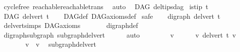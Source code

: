 \begin{isabellebody}
\ cycle{\isacharunderscore}{\kern0pt}free\ reachable{}{\isacharunderscore}{\kern0pt}reachable{\isacharunderscore}{\kern0pt}trans\ \isamarkupfalse%
\ auto%
\endisatagproof
{\isafoldproof}%
%
\isadelimproof
%
\endisadelimproof
%
\isadelimdocument
%
\endisadelimdocument
%
\isatagdocument
%
\isamarkuptrue%
%
\endisatagdocument
{\isafolddocument}%
%
\isadelimdocument
%
\endisadelimdocument
{}\isamarkupfalse%
\ {\isacharparenleft}{\kern0pt}\ DAG{\isacharparenright}{\kern0pt}\ del{\isacharunderscore}{\kern0pt}tips{\isacharunderscore}{\kern0pt}dag{\isacharcolon}{\kern0pt}\isanewline
{}\ {\isachardoublequoteopen}is{\isacharunderscore}{\kern0pt}tip\ t{\isachardoublequoteclose}\isanewline
{}\ {\isachardoublequoteopen}DAG\ {\isacharparenleft}{\kern0pt}del{\isacharunderscore}{\kern0pt}vert\ t{\isacharparenright}{\kern0pt}{\isachardoublequoteclose}\isanewline
%
\isadelimproof
\ \ %
\endisadelimproof
%
\isatagproof
{}\isamarkupfalse%
\ DAG{\isacharunderscore}{\kern0pt}def\ DAG{\isacharunderscore}{\kern0pt}axioms{\isacharunderscore}{\kern0pt}def\isanewline
{}\isamarkupfalse%
\ safe\isanewline
\ \ \isamarkupfalse%
\ {\isachardoublequoteopen}digraph\ {\isacharparenleft}{\kern0pt}del{\isacharunderscore}{\kern0pt}vert\ t{\isacharparenright}{\kern0pt}{\isachardoublequoteclose}\ \isamarkupfalse%
\ del{\isacharunderscore}{\kern0pt}vert{\isacharunderscore}{\kern0pt}simps\ DAG{\isacharunderscore}{\kern0pt}axioms\ \isanewline
\ \ \ \ \ \ digraph{\isacharunderscore}{\kern0pt}def\isanewline
\ \ \ \ \isamarkupfalse%
\ digraph{\isacharunderscore}{\kern0pt}subgraph\ subgraph{\isacharunderscore}{\kern0pt}del{\isacharunderscore}{\kern0pt}vert\isanewline
\ \ \ \ \isamarkupfalse%
\ auto\ \isanewline
{}\isamarkupfalse%
\ \isanewline
\ \ \ \ \isamarkupfalse%
\ v\isanewline
\ \ \ \ \isamarkupfalse%
\ {\isachardoublequoteopen}v\ {\isasymrightarrow}\isactrlsup {\isacharplus}{\kern0pt}\isactrlbsub del{\isacharunderscore}{\kern0pt}vert\ t\isactrlesub \ v{\isachardoublequoteclose}\isanewline
\ \ \ \ \isamarkupfalse%
\ \isamarkupfalse%
\ {\isachardoublequoteopen}v\ {\isasymrightarrow}\isactrlsup {\isacharplus}{\kern0pt}\ v{\isachardoublequoteclose}\ \isamarkupfalse%
\ subgraph{\isacharunderscore}{\kern0pt}del{\isacharunderscore}{\kern0pt}vert\isanewline
\ \ \ \ \ \ \isamarkupfalse%

\end{isabellebody}
